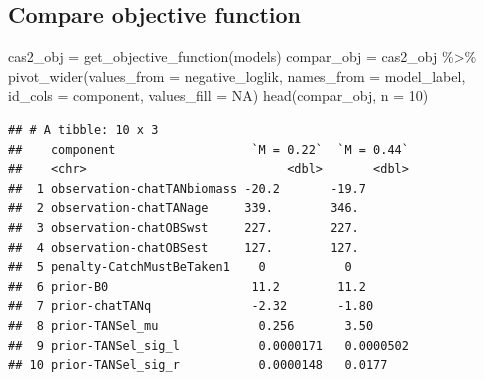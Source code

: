 \documentclass[
]{book}
\newenvironment{Shaded}{\begin{snugshade}}{\end{snugshade}}
\newcommand{\AttributeTok}[1]{\textcolor[rgb]{0.77,0.63,0.00}{#1}}
\newcommand{\ConstantTok}[1]{\textcolor[rgb]{0.00,0.00,0.00}{#1}}
\newcommand{\DecValTok}[1]{\textcolor[rgb]{0.00,0.00,0.81}{#1}}
\newcommand{\FunctionTok}[1]{\textcolor[rgb]{0.00,0.00,0.00}{#1}}
\newcommand{\NormalTok}[1]{#1}
\newcommand{\OtherTok}[1]{\textcolor[rgb]{0.56,0.35,0.01}{#1}}
\newcommand{\SpecialCharTok}[1]{\textcolor[rgb]{0.00,0.00,0.00}{#1}}
\begin{document}
\hypertarget{compare-objective-function}{%
\subsection{Compare objective function}\label{compare-objective-function}}

\begin{Shaded}
\begin{Highlighting}[]
\NormalTok{cas2\_obj }\OtherTok{=} \FunctionTok{get\_objective\_function}\NormalTok{(models)}
\NormalTok{compar\_obj }\OtherTok{=}\NormalTok{ cas2\_obj }\SpecialCharTok{\%\textgreater{}\%} \FunctionTok{pivot\_wider}\NormalTok{(}\AttributeTok{values\_from =}\NormalTok{ negative\_loglik, }\AttributeTok{names\_from =}\NormalTok{ model\_label, }\AttributeTok{id\_cols =}\NormalTok{ component, }\AttributeTok{values\_fill =} \ConstantTok{NA}\NormalTok{)}
\FunctionTok{head}\NormalTok{(compar\_obj, }\AttributeTok{n =} \DecValTok{10}\NormalTok{)}
\end{Highlighting}
\end{Shaded}

\begin{verbatim}
## # A tibble: 10 x 3
##    component                   `M = 0.22`  `M = 0.44`
##    <chr>                            <dbl>       <dbl>
##  1 observation-chatTANbiomass -20.2       -19.7      
##  2 observation-chatTANage     339.        346.       
##  3 observation-chatOBSwst     227.        227.       
##  4 observation-chatOBSest     127.        127.       
##  5 penalty-CatchMustBeTaken1    0           0        
##  6 prior-B0                    11.2        11.2      
##  7 prior-chatTANq              -2.32       -1.80     
##  8 prior-TANSel_mu              0.256       3.50     
##  9 prior-TANSel_sig_l           0.0000171   0.0000502
## 10 prior-TANSel_sig_r           0.0000148   0.0177
\end{verbatim}
\end{document}
